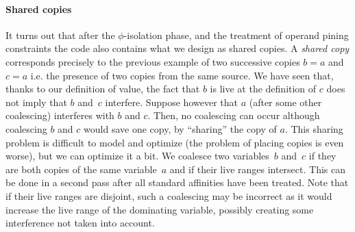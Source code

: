 \paragraph{Shared copies}
It turns out that after the $\phi$-isolation phase, and the treatment of operand pining constraints the code also contains what we design as shared copies. A \emph{shared copy} corresponds precisely to the previous example of two successive copies $b=a$ and $c=a$ i.e. the presence of two copies from the same source. 
We have seen that, thanks to our
definition of value, the fact that $b$ is live at the definition of $c$ does
not imply that $b$ and~$c$ interfere.  Suppose however that $a$ (after some
other coalescing) interferes with $b$ and $c$. Then, no coalescing can occur
although coalescing $b$ and $c$ would save one copy, by ``sharing'' the copy of
$a$.  This sharing problem is difficult to model
and optimize (the problem of placing copies is even worse), but we can optimize
it a bit. We coalesce two variables~$b$ and~$c$ if they are both copies of the
same variable~$a$ and if their live ranges intersect. This can be done in a second pass after all standard affinities have been treated. Note that if their live
ranges are disjoint, such a coalescing may be incorrect as it would increase
the live range of the dominating variable, possibly creating some interference
not taken into account.


